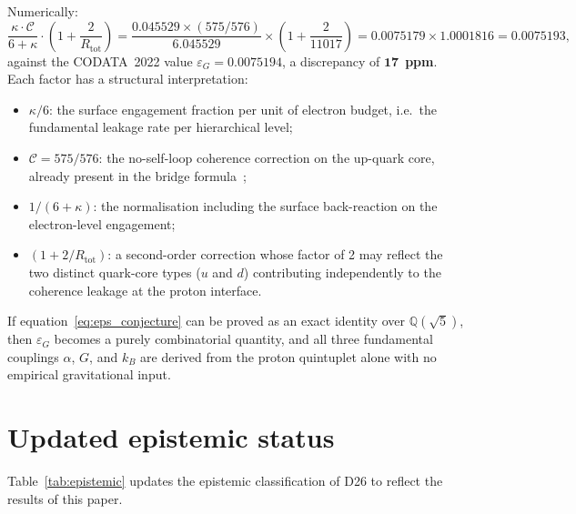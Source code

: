 \documentclass[11pt,a4paper]{article}
\theoremstyle{definition}
\newcommand{\Rtot}{R_{\mathrm{tot}}}
\newcommand{\epsg}{\varepsilon_G}
\newcommand{\calC}{\mathcal{C}}
\newcommand{\kap}{\kappa}
\begin{document}
Numerically:
\begin{equation}
\frac{\kap\cdot\calC}{6+\kap}\cdot\left(1+\frac{2}{\Rtot}\right) = \frac{0.045529\times(575/576)}{6.045529}\times\left(1+\frac{2}{11017}\right) = 0.0075179\times 1.0001816 = 0.0075193,
\end{equation}
against the CODATA~2022 value $\epsg = 0.0075194$, a discrepancy of $\mathbf{17}$~\textbf{ppm}. Each factor has a structural interpretation:
\begin{itemize}
\item $\kap/6$: the surface engagement fraction per unit of electron budget, i.e.\ the fundamental leakage rate per hierarchical level;
\item $\calC = 575/576$: the no-self-loop coherence correction on the up-quark core, already present in the bridge formula~\cite{Bridge_PDL_2026};
\item $1/(6+\kap)$: the normalisation including the surface back-reaction on the electron-level engagement;
\item $(1 + 2/\Rtot)$: a second-order correction whose factor of 2 may reflect the two distinct quark-core types ($u$ and $d$) contributing independently to the coherence leakage at the proton interface.
\end{itemize}

If equation~\eqref{eq:eps_conjecture} can be proved as an exact identity over $\mathbb{Q}(\sqrt{5})$, then $\epsg$ becomes a purely combinatorial quantity, and all three fundamental couplings $\alpha$, $G$, and $k_B$ are derived from the proton quintuplet alone with no empirical gravitational input.

\section{Updated epistemic status}
\label{sec:epistemic}

Table~\ref{tab:epistemic} updates the epistemic classification of D26 to reflect the results of this paper.
\end{document}
